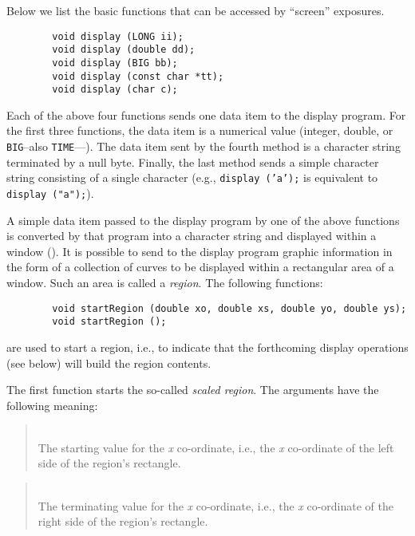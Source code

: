 Below we list the basic functions that can be accessed
by ``screen'' exposures.

\begin{verbatim}
        void display (LONG ii);
        void display (double dd);
        void display (BIG bb);
        void display (const char *tt);
        void display (char c);
\end{verbatim}

Each of the above four functions sends one data item to the display program.
For the first three functions, the data item is a numerical value (integer,
double, or {\tt BIG}--also {\tt TIME}---).
The data item sent by the fourth method is a character string terminated by a
null byte.
Finally, the last method sends a simple character string consisting of a
single character (e.g., {\tt display~('a');} is equivalent to
{\tt display~("a");}).

A simple data item passed to the display program by one of the above
functions is converted by that program into a character string and displayed
within a window ().
It is possible to send to the display program graphic information in the
form of a collection of curves to be displayed within a rectangular area
of a window.
Such an area is called a {\em region}.
The following functions:
\begin{verbatim}
        void startRegion (double xo, double xs, double yo, double ys);
        void startRegion ();
\end{verbatim}
are used to start a region,
i.e., to indicate that the forthcoming display operations (see below)
will build the region contents.

The first function starts the so-called {\em scaled region}.
The arguments have the following meaning:

\medskip

\begin{quote}
\noindent{}\\ \hspace{0in}
The starting value for the {\em x\/} co-ordinate, i.e., the {\em x\/} co-ordinate of the
left side of the region's rectangle.
\end{quote}

\begin{quote}
\noindent{}\\ \hspace{0in}
The terminating value for the {\em x\/} co-ordinate, i.e., the {\em x\/} co-ordinate of the
right side of the region's rectangle.
\end{quote}

